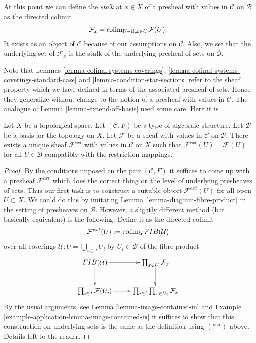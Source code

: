 \noindent
At this point we can define the {\it stalk} at $x \in X$
of a presheaf with values in $\mathcal{C}$ on $\mathcal{B}$
as the directed colimit
$$
\mathcal{F}_x = \mathop{\mathrm{colim}}\nolimits_{U\in \mathcal{B}, x\in U} \mathcal{F}(U).
$$
It exists as an object of $\mathcal{C}$
because of our assumptions on $\mathcal{C}$.
Also, we see that the underlying set of $\mathcal{F}_x$
is the stalk of the underlying presheaf of sets on $\mathcal{B}$.

\medskip\noindent
Note that Lemmas \ref{lemma-cofinal-systems-coverings},
\ref{lemma-cofinal-systems-coverings-standard-case} and
\ref{lemma-condition-star-sections} refer to the sheaf
property which we have defined in terms of the associated presheaf
of sets. Hence they generalize without change to the notion
of a presheaf with values in $\mathcal{C}$. The analogue of
Lemma \ref{lemma-extend-off-basis} need some care. Here it is.

\begin{lemma}
\label{lemma-extend-off-basis-structures}
Let $X$ be a topological space. Let $(\mathcal{C}, F)$ be
a type of algebraic structure.
Let $\mathcal{B}$ be a basis for the topology on $X$.
Let $\mathcal{F}$ be a sheaf with values in $\mathcal{C}$
on $\mathcal{B}$.
There exists a unique sheaf $\mathcal{F}^{ext}$ with values in $\mathcal{C}$
on $X$ such that $\mathcal{F}^{ext}(U) = \mathcal{F}(U)$
for all $U \in \mathcal{B}$ compatibly with the restriction
mappings.
\end{lemma}

\begin{proof}
By the conditions imposed on the pair $(\mathcal{C}, F)$ it
suffices to come up with a presheaf $\mathcal{F}^{ext}$
which does the correct thing on the level of underlying
presheaves of sets. Thus our first task is to construct
a suitable object $\mathcal{F}^{ext}(U)$ for all open $U \subset X$.
We could do this by imitating
Lemma \ref{lemma-diagram-fibre-product} in the setting
of presheaves on $\mathcal{B}$. However, a slightly different method
(but basically equivalent) is the following:
Define it as the directed colimit
$$
\mathcal{F}^{ext}(U)
:=
\mathop{\mathrm{colim}}\nolimits_\mathcal{U} FIB(\mathcal{U})
$$
over all coverings
$\mathcal{U} : U = \bigcup_{i\in I} U_i$ by $U_i \in \mathcal{B}$
of the fibre product
$$
\xymatrix{
FIB(\mathcal{U}) \ar[r] \ar[d] &
\prod\nolimits_{x\in U} \mathcal{F}_x \ar[d] \\
\prod\nolimits_{i\in I} \mathcal{F}(U_i) \ar[r] &
\prod\nolimits_{i \in I} \prod\nolimits_{x\in U_i} \mathcal{F}_x
}
$$
By the usual arguments, see Lemma \ref{lemma-image-contained-in}
and Example \ref{example-application-lemma-image-contained-in}
it suffices to show that this construction on underlying
sets is the same as the definition using $(**)$ above.
Details left to the reader.
\end{proof}

